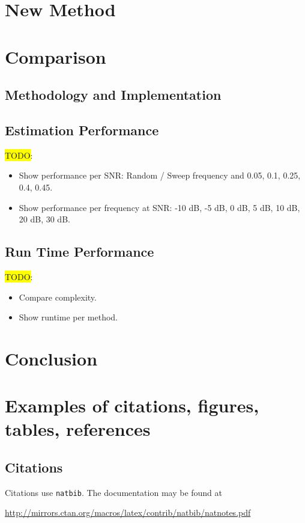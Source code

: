 \documentclass{article}
\newcommand{\marker}[1]{\colorbox{yellow}{#1}}
\begin{document}
\section{New Method}
\label{sec:Cedron3Bins}

\section{Comparison}
\label{sec:Compariosn}

\subsection{Methodology and Implementation}

\subsection{Estimation Performance}

\marker{TODO}:
\begin{itemize}
	\item Show performance per SNR: Random / Sweep frequency and 0.05, 0.1, 0.25, 0.4, 0.45.
	\item Show performance per frequency at SNR: -10 dB, -5 dB, 0 dB, 5 dB, 10 dB, 20 dB, 30 dB.
\end{itemize}

\subsection{Run Time Performance}
\marker{TODO}:
\begin{itemize}
	\item Compare complexity.
	\item Show runtime per method.
\end{itemize}

\section{Conclusion}
\label{sec:Cedron3Bins}



\section{Examples of citations, figures, tables, references}
\label{sec:others}

\subsection{Citations}
Citations use \verb+natbib+. The documentation may be found at
\begin{center}
	\url{http://mirrors.ctan.org/macros/latex/contrib/natbib/natnotes.pdf}
\end{center}
\end{document}
